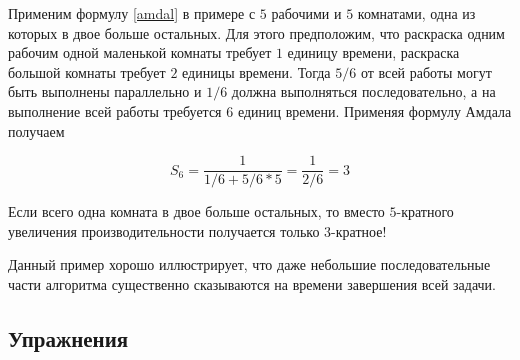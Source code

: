 Применим формулу \eqref{amdal} в примере с $5$ рабочими и $5$ комнатами, одна из
которых в двое больше остальных. Для этого предположим, что раскраска одним
рабочим одной маленькой комнаты требует $1$ единицу времени, раскраска большой
комнаты требует $2$ единицы времени. Тогда $5/6$ от всей работы могут быть
выполнены параллельно и $1/6$ должна выполняться последовательно, а на
выполнение всей работы требуется $6$ единиц времени. Применяя формулу Амдала
получаем

$$S_6 = \frac{1}{1/6 + 5/6*5}=\frac{1}{2/6}=3$$

Если всего одна комната в двое больше остальных, то вместо $5$-кратного
увеличения производительности получается только $3$-кратное!

Данный пример хорошо иллюстрирует, что даже небольшие последовательные части
алгоритма существенно сказываются на времени завершения всей задачи.

\subsection{Упражнения}

